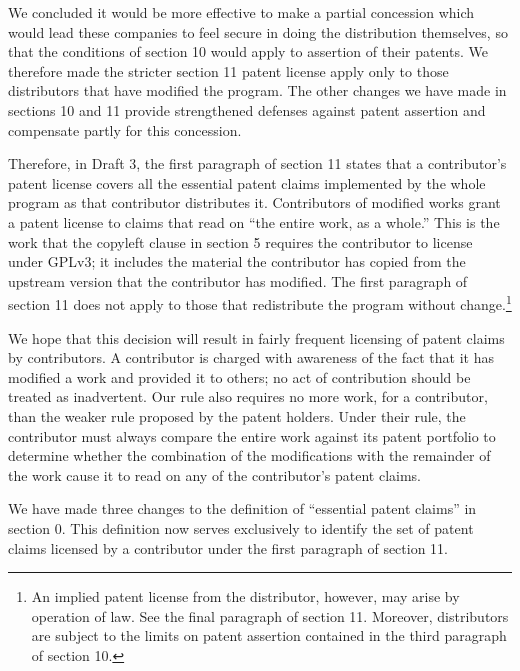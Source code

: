 We concluded it would be more effective to make a partial concession
which would lead these companies to feel secure in doing the
distribution themselves, so that the conditions of section 10 would
apply to assertion of their patents.  We therefore made the stricter
section 11 patent license apply only to those distributors that have
modified the program.  The other changes we have made in sections 10 and
11 provide strengthened defenses against patent assertion and compensate
partly for this concession. 

Therefore, in Draft 3, the first paragraph of section 11 states that a
contributor's patent license covers all the essential patent claims
implemented by the whole program as that contributor distributes it.
Contributors of modified works grant a patent license to claims that
read on ``the entire work, as a whole.'' This is the work that the
copyleft clause in section 5 requires the contributor to license under
GPLv3; it includes the material the contributor has copied from the
upstream version that the contributor has modified.  The first paragraph
of section 11 does not apply to those that redistribute the program
without change.\footnote{An implied patent license from the distributor,
however, may arise by operation of law. See the final paragraph of
section 11.  Moreover, distributors are subject to the limits on patent
assertion contained in the third paragraph of section 10.} 

We hope that this decision will result in fairly frequent licensing of
patent claims by contributors.  A contributor is charged with awareness
of the fact that it has modified a work and provided it to others; no
act of contribution should be treated as inadvertent.  Our rule also
requires no more work, for a contributor, than the weaker rule proposed
by the patent holders.  Under their rule, the contributor must always
compare the entire work against its patent portfolio to determine
whether the combination of the modifications with the remainder of the
work cause it to read on any of the contributor's patent claims.



We have made three changes to the definition of ``essential patent
claims'' in section 0.  This definition now serves exclusively to
identify the set of patent claims licensed by a contributor under the
first paragraph of section 11.

